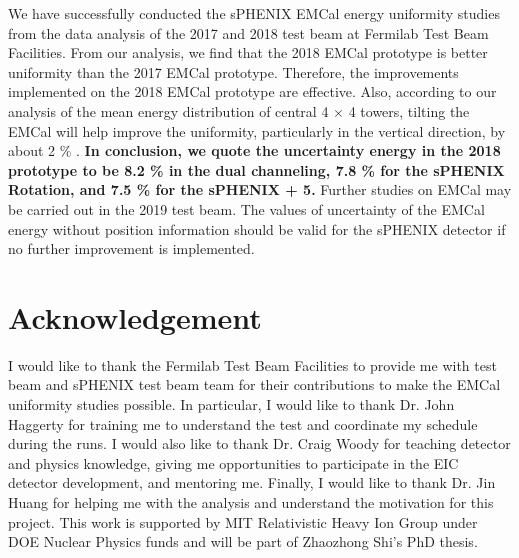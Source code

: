 \documentclass[hidelinks,11pt]{article}
\numberwithin{figure}{section}
\numberwithin{table}{section}
\begin{document}
We have successfully conducted the sPHENIX EMCal energy uniformity studies from the data analysis of the 2017 and 2018 test beam at Fermilab Test Beam Facilities. From our analysis, we find that the 2018 EMCal prototype is better uniformity than the 2017 EMCal prototype. Therefore, the improvements implemented on the 2018 EMCal prototype are effective. Also, according to our analysis of the mean energy distribution of central 4 $\times$ 4 towers, tilting the EMCal will help improve the uniformity, particularly in the vertical direction, by about 2 \% . \textbf{In conclusion, we quote the uncertainty energy in the 2018 prototype to be 8.2 \% in the dual channeling, 7.8 \% for the sPHENIX Rotation, and 7.5 \% for the sPHENIX + 5.} Further studies on EMCal may be carried out in the 2019 test beam. The values of uncertainty of the EMCal energy without position information should be valid for the sPHENIX detector if no further improvement is implemented.






\section{Acknowledgement}

I would like to thank the Fermilab Test Beam Facilities to provide me with test beam and sPHENIX test beam team for their contributions to make the EMCal uniformity studies possible. In particular, I would like to thank Dr. John Haggerty for training me to understand the test and coordinate my schedule during the runs. I would also like to thank Dr. Craig Woody for teaching detector and physics knowledge, giving me opportunities to participate in the EIC detector development, and mentoring me. Finally, I would like to thank Dr. Jin Huang for helping me with the analysis and understand the motivation for this project. This work is supported by MIT Relativistic Heavy Ion Group under DOE Nuclear Physics funds and will be part of Zhaozhong Shi's PhD thesis. 
\end{document}
